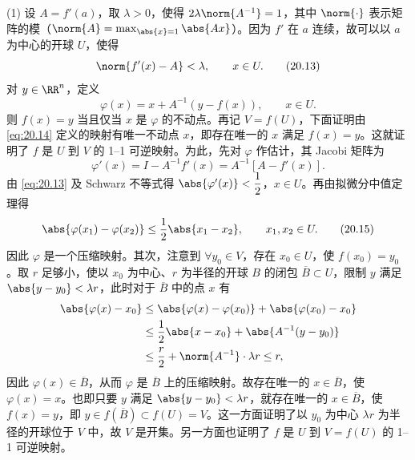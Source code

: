 \begin{xproof}
(1) 设 $A=f'(a)$，取 $\lambda>0$，使得 $2\lambda\norm{A^{-1}}=1$，其中 $\norm{\cdot}$ 表示矩阵的模（$\norm{A}=\max_{\abs{x}=1}\abs{Ax}$）。因为 $f'$ 在 $a$ 连续，故可以以 $a$ 为中心的开球 $U$，使得
\begin{equation}
  \norm{f'(x)-A}<\lambda,\qquad x\in U.
  \tag{20.13}
  \label{eq:20.13}
\end{equation}
对 $y\in\RR^n$，定义
\begin{equation}
  \varphi(x)=x+A^{-1}(y-f(x)),\qquad x\in U.
  \tag{20.14}
  \label{eq:20.14}
\end{equation}
则 $f(x)=y$ 当且仅当 $x$ 是 $\varphi$ 的不动点。再记 $V=f(U)$，下面证明由 \eqref{eq:20.14} 定义的映射有唯一不动点 $x$，即存在唯一的 $x$ 满足 $f(x)=y$。这就证明了 $f$ 是 $U$ 到 $V$ 的 1--1 可逆映射。为此，先对 $\varphi$ 作估计，其 Jacobi 矩阵为
\[
  \varphi'(x)=I-A^{-1}f'(x)=A^{-1}[A-f'(x)].
\]
由 \eqref{eq:20.13} 及 Schwarz 不等式得 $\abs{\varphi'(x)}<\dfrac12$，$x\in U$。再由拟微分中值定理得
\begin{equation}
  \abs{\varphi(x_1)-\varphi(x_2)}\le\frac12\abs{x_1-x_2},
  \qquad x_1,x_2\in U.
  \tag{20.15}
  \label{eq:20.15}
\end{equation}
因此 $\varphi$ 是一个压缩映射。其次，注意到 $\forall y_0\in V$，存在 $x_0\in U$，使 $f(x_0)=y_0$。取 $r$ 足够小，使以 $x_0$ 为中心、$r$ 为半径的开球 $B$ 的闭包 $\overline B\subset U$，限制 $y$ 满足 $\abs{y-y_0}<\lambda r$，此时对于 $\overline B$ 中的点 $x$ 有
\begin{align*}
  \abs{\varphi(x)-x_0}
  &\le\abs{\varphi(x)-\varphi(x_0)}+\abs{\varphi(x_0)-x_0}\\
  &\le\frac12\abs{x-x_0}+\abs{A^{-1}(y-y_0)}\\
  &\le\frac r2+\norm{A^{-1}}\cdot\lambda r\le r,
\end{align*}
因此 $\varphi(x)\in\overline B$，从而 $\varphi$ 是 $\overline B$ 上的压缩映射。故存在唯一的 $x\in\overline B$，使 $\varphi(x)=x$。也即只要 $y$ 满足 $\abs{y-y_0}<\lambda r$，就存在唯一的 $x\in\overline B$，使 $f(x)=y$，即 $y\in f(\overline B)\subset f(U)=V$。这一方面证明了以 $y_0$ 为中心 $\lambda r$ 为半径的开球位于 $V$ 中，故 $V$ 是开集。另一方面也证明了 $f$ 是 $U$ 到 $V=f(U)$ 的 1--1 可逆映射。


\end{xproof}
